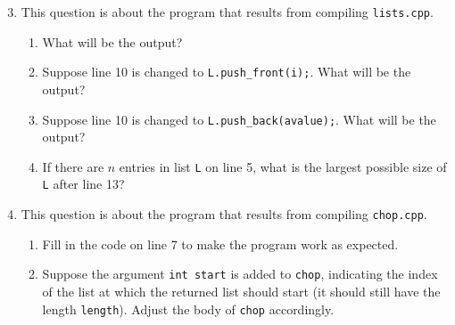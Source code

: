 \documentclass[a4paper,12pt]{article}
\begin{document}
\begin{enumerate}\setcounter{enumi}{2}
\item This question is about the program that results from compiling \texttt{lists.cpp}.
\begin{enumerate}
\item What will be the output?
\item Suppose line 10 is changed to \texttt{L.push\_front(i);}. What will be the output?
\item Suppose line 10 is changed to \texttt{L.push\_back(avalue);}. What will be the output?
\item If there are $n$ entries in list \texttt{L} on line 5, what is the largest possible size of \texttt{L} after line 13?
\end{enumerate}

\item This question is about the program that results from compiling \texttt{chop.cpp}.
\begin{enumerate}
\item Fill in the code on line 7 to make the program work as expected.
\item Suppose the argument \texttt{int start} is added to \texttt{chop}, indicating the index of the list at which the returned list should start (it should still have the length \texttt{length}). Adjust the body of \texttt{chop} accordingly.
\end{enumerate}

\end{enumerate}
\end{document}
